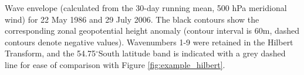 \label{fig:example_envelope}
Wave envelope (calculated from the 30-day running mean, 500 hPa meridional wind) for 22 May 1986 and 29 July 2006. The black contours show the corresponding zonal geopotential height anomaly (contour interval is 60m, dashed contours denote negative values). Wavenumbers 1-9 were retained in the Hilbert Transform, and the 54.75$^{\circ}$South latitude band is indicated with a grey dashed line for ease of comparison with Figure \ref{fig:example_hilbert}. 